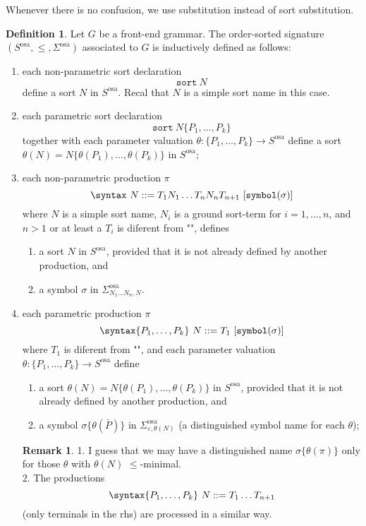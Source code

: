 \documentclass{article}
\theoremstyle{definition}
\theoremstyle{definition}
\theoremstyle{definition}
\newtheorem{definition}{Definition}[section]
\theoremstyle{definition}
\newtheorem{remark}{Remark}[section]
\theoremstyle{definition}
\theoremstyle{theorem}
\theoremstyle{theorem}
\theoremstyle{theorem}
\theoremstyle{theorem}
\theoremstyle{theorem}
\newcommand{\KWsymbol}{\texttt{symbol}}
\newcommand{\sort}{\texttt{sort}}
\begin{document}
{Whenever there is no confusion, we use substitution instead of sort substitution.


\begin{definition}
Let $G$ be a front-end grammar. The order-sorted signature $(S^\textrm{osa},\le, \Sigma^\textrm{osa})$ associated to $G$ is inductively defined as follows:
\begin{enumerate}
\item each non-parametric sort declaration
\[\sort\ N\] 
define a sort $N$ in $S^\textrm{osa}$. Recal that $N$ is a simple sort name in this case.
\item each parametric sort declaration
\[\sort\ N\{P_1,\ldots,P_k\}\]
together with each parameter valuation $\theta : \{P_1,\ldots,P_k\}\to S^\textrm{osa}$ 
define a sort $\theta(N)=N\{\theta(P_1),\ldots,\theta(P_k)\}$ in $S^\textrm{osa}$;
\item each non-parametric production $\pi$
\[\syntax\ N ::= T_1 N_1 \ldots T_n N_n T_{n+1}\ [\KWsymbol(\sigma)]\]
where $N$ is a simple sort name, $N_i$ is a ground sort-term for $i=1,\ldots,n$, and $n>1$  or at least a $T_i$ is diferent from "", defines
\begin{enumerate}
\item a sort $N$ in $S^\textrm{osa}$, provided that it is not already defined by another production, and
\item a symbol $\sigma$ in $\Sigma^\textrm{osa}_{N_1\ldots N_n,N}$.
\end{enumerate}
\item each parametric production $\pi$
\[\syntax\{P_1,\ldots,P_k\}\ N ::= T_1\ [\KWsymbol(\sigma)] \]
where $T_1$ is diferent from "", and each parameter valuation
$\theta : \{P_1,\ldots,P_k\}\to S^\textrm{osa}$ define
\begin{enumerate}
\item a sort $\theta(N)=N\{\theta(P_1),\ldots,\theta(P_k)\}$ in $S^\textrm{osa}$, provided that it is not already defined by another production, and
\item a symbol $\sigma\{\theta(\bar{P})\}$ in $\Sigma^\textrm{osa}_{\varepsilon,\theta(N)}$ (a distinguished symbol name for each $\theta$);
\end{enumerate}
\begin{remark}
1.  I guess that we may have a distinguished name $\sigma\{\theta(\pi)\}$ only for those $\theta$ with $\theta(N)$ $\le$-minimal.\\
2. The productions 
\[\syntax\{P_1,\ldots,P_k\}\ N ::= T_1\ldots T_{n+1} \]
(only terminals in the rhs) are processed in a similar way.

\end{remark}
\end{enumerate}
\end{definition}}
\end{document}

